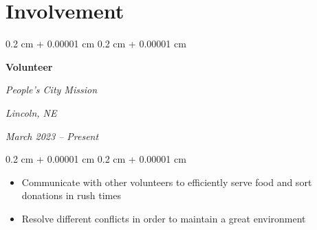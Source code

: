 \documentclass[11pt, letterpaper]{article}
\newenvironment{highlights}{
    \begin{itemize}[
        topsep=0.10 cm,
        parsep=0.10 cm,
        partopsep=0pt,
        itemsep=0pt,
        leftmargin=0.4 cm + 10pt
    ]
}{
    \end{itemize}
} %
\newenvironment{onecolentry}{
    \begin{adjustwidth}{
        0.2 cm + 0.00001 cm
    }{
        0.2 cm + 0.00001 cm
    }
}{
    \end{adjustwidth}
} %
\newenvironment{twocolentry}[2][]{
    \onecolentry
    \def\secondColumn{#2}
    \setcolumnwidth{\fill, 5.0 cm}
    \begin{paracol}{2}
}{
    \switchcolumn \raggedleft \secondColumn
    \end{paracol}
    \endonecolentry
} %
\begin{document}
    
    \section{Involvement}



        
        \begin{twocolentry}{
        \textit{Lincoln, NE}    
            
        \textit{March 2023 – Present}}
            \textbf{Volunteer}
            
            \textit{People's City Mission}
        \end{twocolentry}

        \vspace{0.10 cm}
        \begin{onecolentry}
            \begin{highlights}
                \item Communicate with other volunteers to efficiently serve food and sort donations in rush times
                \item Resolve different conflicts in order to maintain a great environment
            \end{highlights}
        \end{onecolentry}


    



    

    
\end{document}
